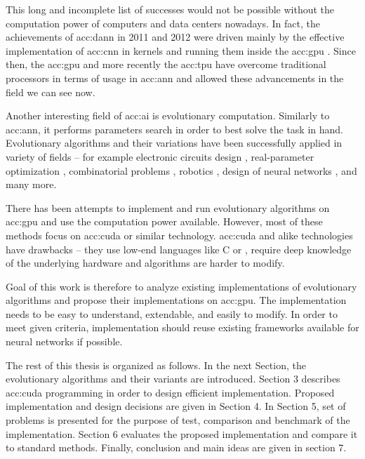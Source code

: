This long and incomplete list of successes would not be possible without the computation power of computers and data centers nowadays. In fact, the achievements of \acrshort{acc:dann} in 2011 and 2012 were driven mainly by the effective implementation of \acrfull{acc:cnn} in kernels and running them inside the \acrfull{acc:gpu} \citep{CIRESAN2012333}. Since then, the \acrshort{acc:gpu} and more recently the \acrfull{acc:tpu} have overcome traditional processors in terms of usage in \acrshort{acc:ann} and allowed these advancements in the field we can see now.

Another interesting field of \acrlong{acc:ai} is evolutionary computation. Similarly to \acrshort{acc:ann}, it performs parameters search in order to best solve the task in hand. Evolutionary algorithms and their variations have been successfully applied in variety of fields -- for example 
electronic circuits design \citep{NASAantenaDesign}\allowbreak\citep{circuitdesignoptimizationea},
real-parameter optimization \citep{IntroNaturalEvolutionStrategies}, 
combinatorial problems \citep{GeneticAssambleLineBalancingProblem}\allowbreak\citep{ALBAYRAK20111313},\linebreak
robotics \citep{EvolutionaryRobotics}\allowbreak\citep{RoboticsInPhysX}\allowbreak\citep{nygaard2018realworld},
design of neural networks \citep{NEAT}\allowbreak\citep{Floreano2008NeuroevolutionFA},
and many more.

There has been attempts to implement and run evolutionary algorithms on \acrshort{acc:gpu} \citep{CHENG2019514} and use the computation power available. However, most of these methods focus on \acrfull{acc:cuda} or similar technology. \acrshort{acc:cuda} and alike technologies have drawbacks -- they use low-end languages like C or \cpp, require deep knowledge of the underlying hardware and algorithms are harder to modify.

Goal of this work is therefore to analyze existing implementations of evolutionary algorithms and propose their implementations on \acrshort{acc:gpu}. The implementation needs to be easy to understand, extendable, and easily to modify. In order to meet given criteria, implementation should reuse existing frameworks available for neural networks if possible.

The rest of this thesis is organized as follows. 
In the next Section, the evolutionary algorithms and their variants are introduced. 
Section 3 describes \acrshort{acc:cuda} programming in order to  design efficient implementation.
Proposed implementation and design decisions are given in Section 4. 
In Section 5, set of problems is presented for the purpose of test, comparison and benchmark of the implementation.
Section 6 evaluates the proposed implementation and compare it to standard methods.
Finally, conclusion and main ideas are given in section 7.
